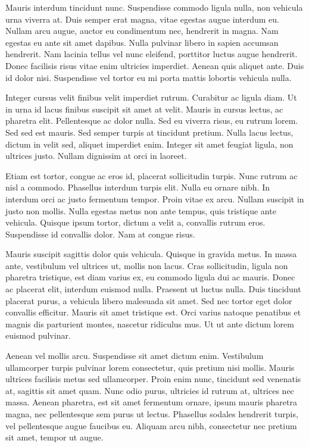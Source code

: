 \documentclass{homework}
\begin{document}
Mauris interdum tincidunt nunc. Suspendisse commodo ligula nulla, non vehicula urna viverra at. Duis semper erat magna, vitae egestas augue interdum eu. Nullam arcu augue, auctor eu condimentum nec, hendrerit in magna. Nam egestas eu ante sit amet dapibus. Nulla pulvinar libero in sapien accumsan hendrerit. Nam lacinia tellus vel nunc eleifend, porttitor luctus augue hendrerit. Donec facilisis risus vitae enim ultricies imperdiet. Aenean quis aliquet ante. Duis id dolor nisi. Suspendisse vel tortor eu mi porta mattis lobortis vehicula nulla.

Integer cursus velit finibus velit imperdiet rutrum. Curabitur ac ligula diam. Ut in urna id lacus finibus suscipit sit amet at velit. Mauris in cursus lectus, ac pharetra elit. Pellentesque ac dolor nulla. Sed eu viverra risus, eu rutrum lorem. Sed sed est mauris. Sed semper turpis at tincidunt pretium. Nulla lacus lectus, dictum in velit sed, aliquet imperdiet enim. Integer sit amet feugiat ligula, non ultrices justo. Nullam dignissim at orci in laoreet.

Etiam est tortor, congue ac eros id, placerat sollicitudin turpis. Nunc rutrum ac nisl a commodo. Phasellus interdum turpis elit. Nulla eu ornare nibh. In interdum orci ac justo fermentum tempor. Proin vitae ex arcu. Nullam suscipit in justo non mollis. Nulla egestas metus non ante tempus, quis tristique ante vehicula. Quisque ipsum tortor, dictum a velit a, convallis rutrum eros. Suspendisse id convallis dolor. Nam at congue risus.

Mauris suscipit sagittis dolor quis vehicula. Quisque in gravida metus. In massa ante, vestibulum vel ultrices ut, mollis non lacus. Cras sollicitudin, ligula non pharetra tristique, est diam varius ex, eu commodo ligula dui ac mauris. Donec ac placerat elit, interdum euismod nulla. Praesent ut luctus nulla. Duis tincidunt placerat purus, a vehicula libero malesuada sit amet. Sed nec tortor eget dolor convallis efficitur. Mauris sit amet tristique est. Orci varius natoque penatibus et magnis dis parturient montes, nascetur ridiculus mus. Ut ut ante dictum lorem euismod pulvinar.

Aenean vel mollis arcu. Suspendisse sit amet dictum enim. Vestibulum ullamcorper turpis pulvinar lorem consectetur, quis pretium nisi mollis. Mauris ultrices facilisis metus sed ullamcorper. Proin enim nunc, tincidunt sed venenatis at, sagittis sit amet quam. Nunc odio purus, ultricies id rutrum at, ultrices nec massa. Aenean pharetra, est sit amet fermentum ornare, ipsum mauris pharetra magna, nec pellentesque sem purus ut lectus. Phasellus sodales hendrerit turpis, vel pellentesque augue faucibus eu. Aliquam arcu nibh, consectetur nec pretium sit amet, tempor ut augue.
\end{document}
